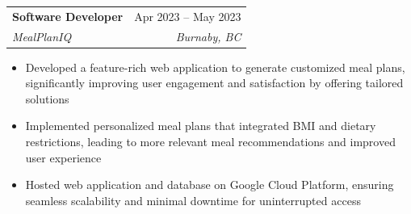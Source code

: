\documentclass[letterpaper,11pt]{article}
\makeatletter
\newcommand{\resumeItem}[1]{
  \item\small{
    {#1 \vspace{-2pt}}
  }
}
\newcommand{\resumeSubheading}[4]{
  \vspace{-2pt}\item
    \begin{tabular*}{0.97\textwidth}[t]{l@{\extracolsep{\fill}}r}
      \textbf{#1} & #2 \\
      \textit{\small#3} & \textit{\small #4} \\
    \end{tabular*}\vspace{-7pt}
}
\newcommand{\resumeItemListStart}{\begin{itemize}}
\newcommand{\resumeItemListEnd}{\end{itemize}\vspace{-5pt}}
\makeatother
\begin{document}
\resumeSubheading
{Software Developer}{Apr 2023 -- May 2023}
{MealPlanIQ}{Burnaby, BC}
\resumeItemListStart
\resumeItem{Developed a feature-rich web application to generate customized meal plans, significantly improving user engagement and satisfaction by offering tailored solutions}
\resumeItem{Implemented personalized meal plans that integrated BMI and dietary restrictions, leading to more relevant meal recommendations and improved user experience}
\resumeItem{Hosted web application and database on Google Cloud Platform, ensuring seamless scalability and minimal downtime for uninterrupted access}
\resumeItemListEnd




\end{document}
